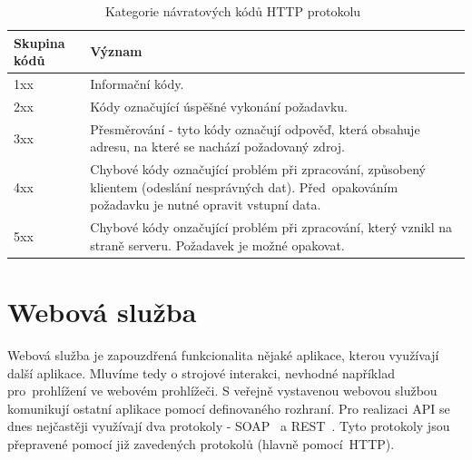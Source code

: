 \begin{table}[ht!]
  \centering
  \begin{tabular}{|l|p{9cm}|}
    \hline
    \textbf{Skupina kódů} & \textbf{Význam}\\
    \hline
    1xx & Informační kódy.\\
    \hline
    2xx & Kódy označující úspěšné vykonání požadavku.\\
    \hline
    3xx & Přesměrování - tyto kódy označují odpověď, která obsahuje adresu, na které se nachází požadovaný zdroj.\\
    \hline
    4xx & Chybové kódy označující problém při zpracování, způsobený klientem (odeslání nesprávných dat). Před~opakováním požadavku je nutné opravit vstupní data.\\
    \hline
    5xx & Chybové kódy onzačující problém při zpracování, který vznikl na straně serveru. Požadavek je možné opakovat.\\
    \hline
  \end{tabular}
  \caption{Kategorie návratových kódů HTTP protokolu~\cite{rest_vse}}
  \label{tab:http_kody}
\end{table}
  
\section{Webová služba}
  
Webová služba je zapouzdřená funkcionalita nějaké aplikace, kterou využívají další aplikace.
Mluvíme tedy o strojové interakci, nevhodné například pro~prohlížení ve webovém prohlížeči.
S veřejně vystavenou webovou službou komunikují ostatní aplikace pomocí definovaného rozhraní.
Pro realizaci API se dnes nejčastěji využívají dva protokoly - SOAP~\cite{soap} a REST~\cite{rest}.
Tyto protokoly jsou přepravené pomocí již zavedených protokolů (hlavně pomocí~HTTP).